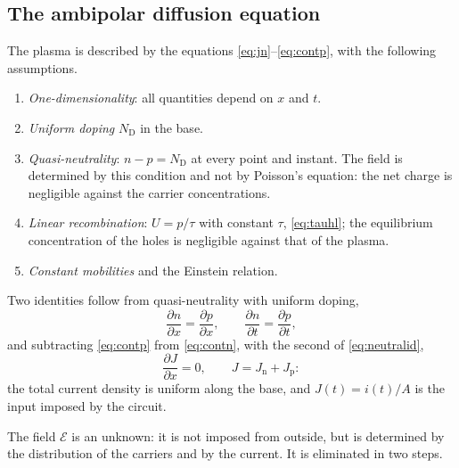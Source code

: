 \documentclass[10pt,a4paper]{scrartcl}
\newcommand{\Ef}{\mathcal{E}}                 %
\newcommand{\ND}{N_\mathrm{D}}
\newcommand{\Jn}{J_\mathrm{n}}
\newcommand{\Jp}{J_\mathrm{p}}
\newcommand{\dpar}[2]{\frac{\partial #1}{\partial #2}}
\begin{document}
\subsection{The ambipolar diffusion equation}
\label{sec:ambipolar}
The plasma is described by the equations \eqref{eq:jn}--\eqref{eq:contp}, with the following assumptions.
\begin{enumerate}
\item \emph{One-dimensionality}: all quantities depend on $x$ and $t$.
\item \emph{Uniform doping} $\ND$ in the base.
\item \emph{Quasi-neutrality}: $n - p = \ND$ at every point and instant. The field is determined by this condition and not by Poisson's equation: the net charge is negligible against the carrier concentrations.
\item \emph{Linear recombination}: $U = p/\tau$ with constant $\tau$, \eqref{eq:tauhl}; the equilibrium concentration of the holes is negligible against that of the plasma.
\item \emph{Constant mobilities} and the Einstein relation.
\end{enumerate}
Two identities follow from quasi-neutrality with uniform doping,
\begin{equation}
\dpar{n}{x} = \dpar{p}{x} , \qquad \dpar{n}{t} = \dpar{p}{t} ,
\label{eq:neutralid}
\end{equation}
and subtracting \eqref{eq:contp} from \eqref{eq:contn}, with the second of \eqref{eq:neutralid},
\begin{equation}
\dpar{J}{x} = 0 , \qquad J = \Jn + \Jp :
\label{eq:juniform}
\end{equation}
the total current density is uniform along the base, and $J(t) = i(t)/A$ is the input imposed by the circuit.

The field $\Ef$ is an unknown: it is not imposed from outside, but is determined by the distribution of the carriers and by the current. It is eliminated in two steps.
\end{document}

